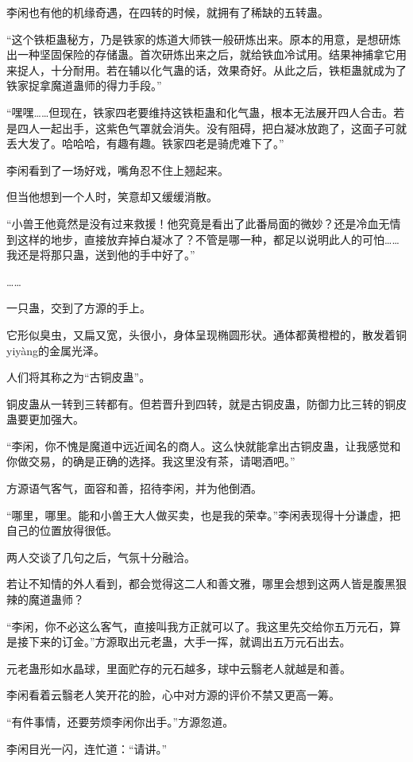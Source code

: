 \begin{this_body}
李闲也有他的机缘奇遇，在四转的时候，就拥有了稀缺的五转蛊。

“这个铁柜蛊秘方，乃是铁家的炼道大师铁一般研炼出来。原本的用意，是想研炼出一种坚固保险的存储蛊。首次研炼出来之后，就给铁血冷试用。结果神捕拿它用来捉人，十分耐用。若在辅以化气蛊的话，效果奇好。从此之后，铁柜蛊就成为了铁家捉拿魔道蛊师的得力手段。”

“嘿嘿……但现在，铁家四老要维持这铁柜蛊和化气蛊，根本无法展开四人合击。若是四人一起出手，这紫色气罩就会消失。没有阻碍，把白凝冰放跑了，这面子可就丢大发了。哈哈哈，有趣有趣。铁家四老是骑虎难下了。”

李闲看到了一场好戏，嘴角忍不住上翘起来。

但当他想到一个人时，笑意却又缓缓消散。

“小兽王他竟然是没有过来救援！他究竟是看出了此番局面的微妙？还是冷血无情到这样的地步，直接放弃掉白凝冰了？不管是哪一种，都足以说明此人的可怕……我还是将那只蛊，送到他的手中好了。”

……

一只蛊，交到了方源的手上。

它形似臭虫，又扁又宽，头很小，身体呈现椭圆形状。通体都黄橙橙的，散发着铜yiyàng的金属光泽。

人们将其称之为“古铜皮蛊”。

铜皮蛊从一转到三转都有。但若晋升到四转，就是古铜皮蛊，防御力比三转的铜皮蛊要更加强大。

“李闲，你不愧是魔道中远近闻名的商人。这么快就能拿出古铜皮蛊，让我感觉和你做交易，的确是正确的选择。我这里没有茶，请喝酒吧。”

方源语气客气，面容和善，招待李闲，并为他倒酒。

“哪里，哪里。能和小兽王大人做买卖，也是我的荣幸。”李闲表现得十分谦虚，把自己的位置放得很低。

两人交谈了几句之后，气氛十分融洽。

若让不知情的外人看到，都会觉得这二人和善文雅，哪里会想到这两人皆是腹黑狠辣的魔道蛊师？

“李闲，你不必这么客气，直接叫我方正就可以了。我这里先交给你五万元石，算是接下来的订金。”方源取出元老蛊，大手一挥，就调出五万元石出去。

元老蛊形如水晶球，里面贮存的元石越多，球中云翳老人就越是和善。

李闲看着云翳老人笑开花的脸，心中对方源的评价不禁又更高一筹。

“有件事情，还要劳烦李闲你出手。”方源忽道。

李闲目光一闪，连忙道：“请讲。”


\end{this_body}

